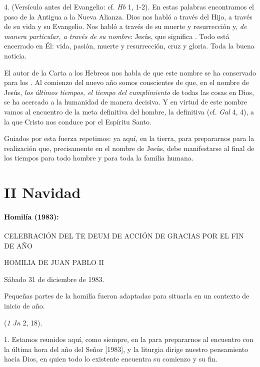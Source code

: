 \begin{body}
	4.  (Versículo antes del Evangelio: cf. \emph{Hb} 1, 1-2). En estas palabras encontramos el paso de la Antigua a la Nueva Alianza. Dios nos habló a través del Hijo, a través de su vida y su Evangelio. Nos habló a través de su muerte y resurrección y, \emph{de manera particular, a través de su nombre}: Jesús, que significa . Todo está encerrado en Él: vida, pasión, muerte y resurrección, cruz y gloria. Toda la buena noticia.
	
	El autor de la Carta a los Hebreos nos habla de que este nombre se ha conservado para los . Al comienzo del nuevo año somos conscientes de que, en el nombre de Jesús, \emph{los últimos tiempos, el tiempo del cumplimiento} de todas las cosas en Dios, se ha acercado a la humanidad de manera decisiva. Y en virtud de este nombre vamos al encuentro de la meta definitiva del hombre, la definitiva  (cf. \emph{Gal} 4, 4), a la que Cristo nos conduce por el Espíritu Santo.
	
	Guiados por esta fuerza repetimos:  ya aquí, en la tierra, para prepararnos para la realización que, precisamente en el nombre de Jesús, debe manifestarse al final de los tiempos para todo hombre y para toda la familia humana.
	
	
	
	\chapter{II Navidad}
	
	\subsubsection{Homilía (1983): }
	
	CELEBRACIÓN DEL TE DEUM DE ACCIÓN DE GRACIAS POR EL FIN DE AÑO
	
	HOMILIA DE JUAN PABLO II
	
	Sábado 31 de diciembre de 1983.
	
	Pequeñas partes de la homilía fueron adaptadas para situarla en un contexto de inicio de año.
	
	 (\emph{1 Jn} 2, 18).
	
	1. Estamos reunidos aquí, como siempre, en la  para prepararnos al encuentro con la última hora del año del Señor {[}1983{]}, y la liturgia dirige nuestro pensamiento hacia Dios, en quien todo lo existente encuentra su comienzo y su fin.
	

\end{body}
